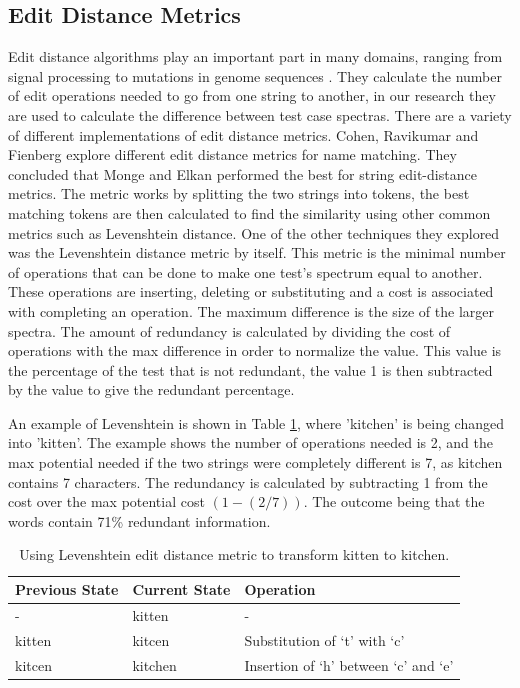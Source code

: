 \documentclass[11pt
              , a4paper
              , twoside
              , openright
              ]{report}
\begin{document}
\subsection{Edit Distance Metrics}
\label{editdistbg}
Edit distance algorithms play an important part in many domains, ranging from signal processing to mutations in genome sequences \cite{navarro2001guided}. They calculate the number of edit operations needed to go from one string to another, in our research they are used to calculate the difference between test case spectras. There are a variety of different implementations of edit distance metrics. Cohen, Ravikumar and Fienberg \cite{cohen2003comparison} explore different edit distance metrics for name matching. They concluded that Monge and Elkan \cite{monge1997efficient} performed the best for string edit-distance metrics. The metric works by splitting the two strings into tokens, the best matching tokens are then calculated to find the similarity using other common metrics such as Levenshtein distance. One of the other techniques they explored was the Levenshtein distance \cite{levenshtein1966binary} metric by itself. This metric is the minimal number of operations that can be done to make one test's spectrum equal to another. These operations are inserting, deleting or substituting and a cost is associated with completing an operation. The maximum difference is the size of the larger spectra. The amount of redundancy is calculated by dividing the cost of operations with the max difference in order to normalize the value. This value is the percentage of the test that is not redundant, the value 1 is then subtracted by the value to give the redundant percentage.

An example of Levenshtein is shown in Table \ref{levenTable}, where 'kitchen' is being changed into 'kitten'. The example shows the number of operations needed is 2, and the max potential needed if the two strings were completely different is 7, as kitchen contains 7 characters. The redundancy is calculated by subtracting 1 from the cost over the max potential cost $(1 - (2/7)) $. The outcome being that the words contain 71\% redundant information. 

\begin{table}[H]
\centering

\begin{tabular}{|l|l|l|}
\hline
{\bf Previous State} & {\bf Current State} & {\bf Operation}                      \\ \hline
-                    & kitten              & -                                    \\ \hline
kitten               & kitcen              & Substitution of `t' with `c'         \\ \hline
kitcen               & kitchen             & Insertion of `h' between `c' and `e' \\ \hline
\end{tabular}
\caption{Using Levenshtein edit distance metric to transform kitten to kitchen.}
\label{levenTable}
\end{table}
\end{document}
